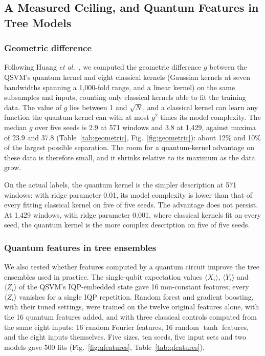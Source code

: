 \documentclass[journal]{IEEEtran}
\begin{document}
\subsection{A Measured Ceiling, and Quantum Features in Tree Models}
\label{sec:sq4}

\subsubsection{Geometric difference}
Following Huang \textit{et al.}~\cite{huang2021power}, we computed the geometric
difference $g$ between the QSVM's quantum kernel and eight classical kernels
(Gaussian kernels at seven bandwidths spanning a 1,000-fold range, and a linear
kernel) on the same subsamples and inputs, counting only classical kernels able
to fit the training data. The value of $g$ lies between 1 and $\sqrt{N}$, and a
classical kernel can learn any function the quantum kernel can with at most
$g^2$ times its model complexity. The median $g$ over five seeds is 2.9 at 571
windows and 3.8 at 1,429, against maxima of 23.9 and 37.8
(Table~\ref{tab:geometric}, Fig.~\ref{fig:geometric}): about 12\% and 10\% of
the largest possible separation. The room for a quantum-kernel advantage on
these data is therefore small, and it shrinks relative to its maximum as the
data grow.

On the actual labels, the quantum kernel is the simpler description at
571 windows: with ridge parameter 0.01, its model complexity is lower than that
of every fitting classical kernel on five of five seeds. The advantage does not
persist. At 1,429 windows, with ridge parameter 0.001, where classical kernels
fit on every seed, the quantum kernel is the more complex description on five of
five seeds.

\subsubsection{Quantum features in tree ensembles}
We also tested whether features computed by a quantum circuit improve the tree
ensembles used in practice. The single-qubit expectation values $\langle
X_i\rangle$, $\langle Y_i\rangle$ and $\langle Z_i\rangle$ of the QSVM's
IQP-embedded state gave 16 non-constant features; every $\langle Z_i\rangle$
vanishes for a single IQP repetition. Random forest and gradient boosting, with
their tuned settings, were trained on the twelve original features alone, with
the 16 quantum features added, and with three classical controls computed from
the same eight inputs: 16 random Fourier features, 16 random $\tanh$ features,
and the eight inputs themselves. Five sizes, ten seeds, five input sets and two
models gave 500 fits (Fig.~\ref{fig:qfeatures}, Table~\ref{tab:qfeatures}).
\end{document}
